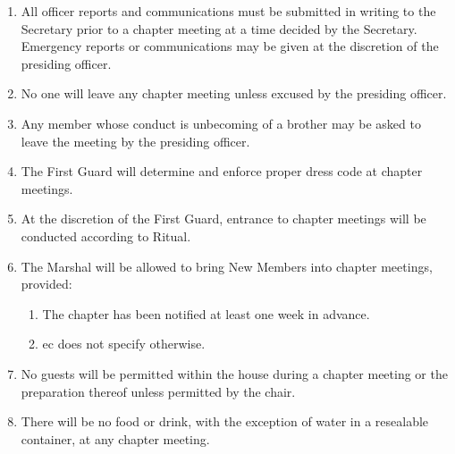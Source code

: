 	\begin{enumerate}
		\item All officer reports and communications must be submitted in writing to the Secretary prior to a chapter meeting at a time decided by the Secretary. Emergency reports or communications may be given at the discretion of the presiding officer.
		\item No one will leave any chapter meeting unless excused by the presiding officer.

		\item Any member whose conduct is unbecoming of a brother may be asked to leave the meeting by the presiding officer.

		\item The First Guard will determine and enforce proper dress code at chapter meetings. \label{chapter-dress}

		\item At the discretion of the First Guard, entrance to chapter meetings will be conducted according to Ritual.

		\item The Marshal will be allowed to bring New Members into chapter meetings, provided:

			\begin{enumerate}

				\item The chapter has been notified at least one week in advance.

				\item \Gls{ec} does not specify otherwise.

			\end{enumerate}

		\item No guests will be permitted within the house during a chapter meeting or the preparation thereof unless permitted by the chair.
		
        \item There will be no food or drink, with the exception of water in a resealable container, at any chapter meeting.

	\end{enumerate}
